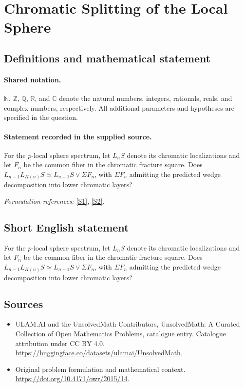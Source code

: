 \documentclass[11pt]{article}
\newcommand{\sref}[2]{\hyperlink{source:#1:#2}{[S#2]}}
\begin{document}
\section{Chromatic Splitting of the Local Sphere}\label{statement}

\subsection{Definitions and mathematical statement}

\paragraph{Shared notation.}$\mathbb N$, $\mathbb Z$, $\mathbb Q$, $\mathbb R$, and $\mathbb C$ denote the natural numbers, integers, rationals, reals, and complex numbers, respectively. All additional parameters and hypotheses are specified in the question.


\paragraph{Statement recorded in the supplied source.}
For the $p$-local sphere spectrum, let $L_nS$ denote its chromatic localizations and let $F_n$ be the common fiber in the chromatic fracture square. Does $L_{n-1}L_{K(n)}S\simeq L_{n-1}S\vee\Sigma F_n$, with $\Sigma F_n$ admitting the predicted wedge decomposition into lower chromatic layers?
\par\smallskip\textit{Formulation references:} \sref{statement}{1}, \sref{statement}{2}.
\subsection{Short English statement}
For the $p$-local sphere spectrum, let $L_nS$ denote its chromatic localizations and let $F_n$ be the common fiber in the chromatic fracture square. Does $L_{n-1}L_{K(n)}S\simeq L_{n-1}S\vee\Sigma F_n$, with $\Sigma F_n$ admitting the predicted wedge decomposition into lower chromatic layers?
\subsection{Sources}
\begin{itemize}
\item[\hypertarget{source:statement:1}{S1}] ULAM.AI and the UnsolvedMath Contributors, UnsolvedMath: A Curated Collection of Open Mathematics Problems, catalogue entry. Catalogue attribution under CC BY 4.0.
\url{https://huggingface.co/datasets/ulamai/UnsolvedMath}.
\item[\hypertarget{source:statement:2}{S2}] Original problem formulation and mathematical context.
\url{https://doi.org/10.4171/owr/2015/14}.
\end{itemize}
\label{end:statement}
\end{document}
